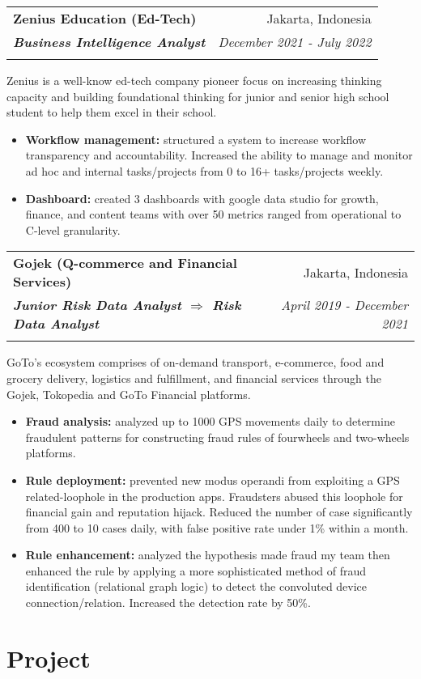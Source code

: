 \documentclass[a4paper, 11pt]{article}
\makeatletter
\newcommand{\resumeItem}[2]{
    \item\small{
        \textbf{#1}{#2 \vspace{-2pt}}
    }
}
\newcommand{\resumeSubheading}[4]{
    \vspace{-1pt}
    \begin{tabular*}{\textwidth}{l@{\extracolsep{\fill}}r}
        \color{lightblue}\textbf{#1} & #2 \\
        \textbf{\textit{\small#3}} & \textit{\small #4} \\
        \textnormal{}\vspace{-5pt}
    \end{tabular*}\vspace{-5pt}
}
\newcommand{\resumeItemListStart}{\begin{itemize}[leftmargin=*]\setlength\itemsep{0em}\vspace{-1pt}}
\newcommand{\resumeItemListEnd}{\end{itemize}\vspace{-5pt}}
\makeatother
\begin{document}
    \vspace{5pt}
    \resumeSubheading
    {Zenius Education (Ed-Tech)}
    {Jakarta, Indonesia}
    {Business Intelligence Analyst}
    {December 2021 - July 2022}
    \small{Zenius is a well-know ed-tech company pioneer focus on increasing thinking 
    capacity and building foundational thinking for junior and senior high school 
    student to help them excel in their school.}
    \vspace{-1pt}
    \resumeItemListStart
    \resumeItem{Workflow management:}{ structured a system to increase 
    workflow transparency and accountability. Increased the ability to manage 
    and monitor ad hoc and internal tasks/projects from 0 to 
    16+ tasks/projects weekly.}
    \resumeItem{Dashboard:}{ created 3 dashboards with google data studio for growth,
    finance, and content teams with over 50 metrics ranged from operational to
    C-level granularity.}
    \resumeItemListEnd

    \vspace{5pt}
    \resumeSubheading
    {Gojek (Q-commerce and Financial Services)}
    {Jakarta, Indonesia}
    {Junior Risk Data Analyst $\Rightarrow$ Risk Data Analyst}
    {April 2019 - December 2021}
    \small{GoTo’s ecosystem comprises of on-demand transport, e-commerce, food and grocery 
    delivery, logistics and fulfillment, and financial services through the Gojek, 
    Tokopedia and GoTo Financial platforms.}
    \vspace{-1pt}
    \resumeItemListStart
    \resumeItem{Fraud analysis:}{ analyzed up to 1000 GPS movements
    daily to determine fraudulent patterns for constructing fraud 
    rules of fourwheels and two-wheels platforms.}
    \resumeItem{Rule deployment:}{ prevented new modus operandi from exploiting a GPS 
    related-loophole in the production apps. Fraudsters abused this loophole for 
    financial gain and reputation hijack. Reduced the number of
    case significantly from 400 to 10 cases daily, with false positive rate under 1\%
    within a month.}
    \resumeItem{Rule enhancement:}{ analyzed the hypothesis made fraud my 
    team then enhanced the rule by applying a more sophisticated method of fraud 
    identification (relational graph logic) to detect the convoluted device 
    connection/relation. Increased the detection rate by 50\%.}
    \resumeItemListEnd

    \vspace{-5pt}
    \section{Project}
\end{document}
